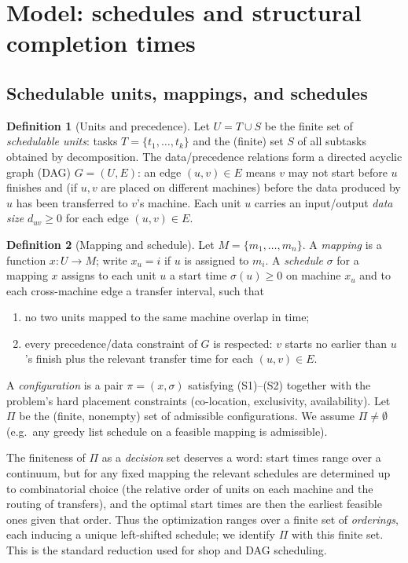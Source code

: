 \documentclass{amsart}
\theoremstyle{definition}
\newtheorem{definition}{Definition}
\begin{document}
\section{Model: schedules and structural completion times}\label{sec:model}

\subsection{Schedulable units, mappings, and schedules}

\begin{definition}[Units and precedence]\label{def:units}
Let $U=T\cup S$ be the finite set of \emph{schedulable units}: tasks
$T=\{t_1,\dots,t_k\}$ and the (finite) set $S$ of all subtasks obtained by
decomposition. The data/precedence relations form a directed acyclic graph
(DAG) $G=(U,E)$: an edge $(u,v)\in E$ means $v$ may not start before $u$
finishes and (if $u,v$ are placed on different machines) before the data
produced by $u$ has been transferred to $v$'s machine. Each unit $u$ carries an
input/output \emph{data size} $d_{uv}\ge0$ for each edge $(u,v)\in E$.
\end{definition}

\begin{definition}[Mapping and schedule]\label{def:sched}
Let $M=\{m_1,\dots,m_n\}$. A \emph{mapping} is a function $x\colon U\to M$;
write $x_u=i$ if $u$ is assigned to $m_i$. A \emph{schedule} $\sigma$ for a
mapping $x$ assigns to each unit $u$ a start time $\sigma(u)\ge0$ on machine
$x_u$ and to each cross-machine edge a transfer interval, such that
\begin{enumerate}
\item[(S1)] no two units mapped to the same machine overlap in time;
\item[(S2)] every precedence/data constraint of $G$ is respected: $v$ starts no
earlier than $u$'s finish plus the relevant transfer time for each $(u,v)\in E$.
\end{enumerate}
A \emph{configuration} is a pair $\pi=(x,\sigma)$ satisfying (S1)--(S2) together
with the problem's hard placement constraints (co-location, exclusivity,
availability). Let $\Pi$ be the (finite, nonempty) set of admissible
configurations. We assume $\Pi\neq\emptyset$ (e.g.\ any greedy list schedule on
a feasible mapping is admissible).
\end{definition}

The finiteness of $\Pi$ as a \emph{decision} set deserves a word: start times
range over a continuum, but for any fixed mapping the relevant schedules are
determined up to combinatorial choice (the relative order of units on each
machine and the routing of transfers), and the optimal start times are then the
earliest feasible ones given that order. Thus the optimization ranges over a
finite set of \emph{orderings}, each inducing a unique left-shifted schedule;
we identify $\Pi$ with this finite set. This is the standard reduction used for
shop and DAG scheduling.
\end{document}
